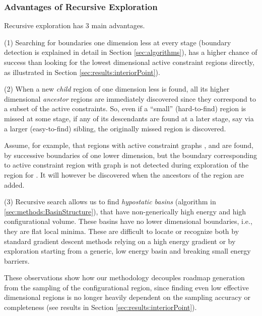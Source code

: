 \documentclass[]{article}
\begin{document}
\subsubsection{Advantages of Recursive Exploration}
\label{sec:advantagesRS}
Recursive exploration has 3 main advantages.

(1) Searching for boundaries one dimension less at every
stage (boundary detection is explained in detail in Section
\ref{sec:algorithms}), has a higher chance of success than looking
for the lowest dimensional active constraint regions directly, as
illustrated in Section \ref{sec:results:interiorPoint}). 

(2) When a new \emph{child} region of one dimension less is found, all its
higher dimensional \emph{ancestor} regions are immediately discovered since
they correspond to a subset of the active constraints.  So, even if a ``small''
(hard-to-find) region is missed at some stage, if any of its descendants are
found at a later stage, say via a larger (easy-to-find) sibling, the originally
missed region is discovered.

Assume, for example, that regions with active constraint graphs ,  and  are found, by successive boundaries of one
lower dimension, but the boundary corresponding to active constraint region
with graph  is not detected during exploration of the region for .
It will however be discovered when the ancestors of the region  are added.


(3)  Recursive search allows us to find \emph{hypostatic basins} (algorithm in
\ref{sec:methods:BasinStructure}), that have non-generically high energy and
high configurational volume. These basins have no lower dimensional boundaries,
i.e., they are flat local minima. These are difficult to locate or recognize
both by standard gradient descent methods relying on a high energy gradient or by
exploration starting from a generic, low energy basin and breaking small energy
barriers.

These observations show how our methodology decouples roadmap generation from
the sampling of the configurational region, since finding even low effective
dimensional regions is no longer heavily dependent on the sampling accuracy or
completeness (see results in Section \ref{sec:results:interiorPoint}).
\end{document}
